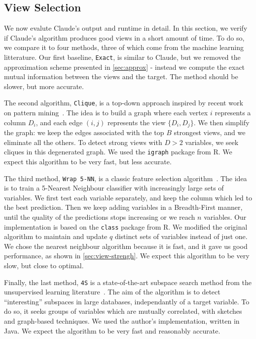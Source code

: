 \subsection{View Selection}
\label{sec:exp-view-selection}

We now evalute Claude's output and runtime in detail. In this section, we
verify if Claude's algorithm produces good views in a short amount of time. To
do so, we compare it to four methods, three of which come from the machine
learning litterature.  Our first baseline, \texttt{Exact}, is similar to
Claude, but we removed the approximation scheme presented in \ref{sec:approx} -
instead we compute the exact mutual information between the views and the
target. The method should be slower, but more accurate. 

The second algorithm, \texttt{Clique}, is a top-down approach inspired by
recent work on pattern mining~\cite{xie2010max}. The idea is to build a graph
where each vertex $i$ represents a column $D_i$, and each edge $(i,j)$
represents the view $\{D_i, D_j\}$. We then simplify the graph: we keep the
edges associated with the top $B$ strongest views, and we eliminate all the
others. To detect strong views with $D >2$ variables, we seek cliques in this
degenerated graph. We used the \texttt{igraph} package from R. We expect this
algorithm to be very fast, but less accurate.

The third method, \texttt{Wrap 5-NN}, is a classic feature selection
algorithm~\cite{guyon2003introduction}. The idea is to train a 5-Nearest
Neighbour classifier with increasingly large sets of variables. We first test
each variable separately, and keep the column which led to the best prediction.
Then we keep adding variables in a Breadth-First manner, until the
quality of the predictions stops increasing or we reach $n$ variables. Our
implementation is based on the \texttt{class} package from R.  We modified the
original algorithm to maintain and update $q$ distinct sets of variables
instead of just one. We chose the nearest neighbour algorithm because it is
fast, and it gave us good performance, as shown in \ref{sec:view-strengh}. We
expect this algorithm to be very slow, but close to optimal.

Finally, the last method, \texttt{4S} is a state-of-the-art subspace search
method from the unsupervised learning literature~\cite{nguyen20134s}. The aim
of the algorithm is to detect ``interesting'' subspaces in large databases,
independantly of a target variable. To do so, it seeks groups of variables
which are mutually correlated, with sketches and graph-based techniques.  We
used the author's implementation, written in Java. We expect the algorithm to
be very fast and reasonably accurate.

